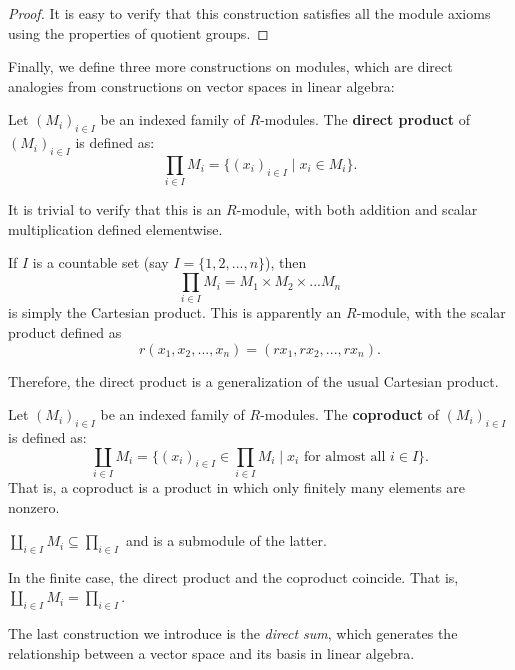 \documentclass[12pt, a4paper, titlepage]{report}
\begin{document}
\begin{proof}
  It is easy to verify that this construction satisfies all the module axioms using the properties of quotient groups.
\end{proof}

Finally, we define three more constructions on modules, which are direct analogies from constructions on vector spaces in linear algebra:

\begin{defn}
  Let $(M_i)_{i \in I}$ be an indexed family of $R$-modules. The \textbf{direct product} of $(M_i)_{i \in I}$ is defined as:
  \[
    \prod_{i \in I} M_i = \{ (x_i)_{i \in I} \mid x_i \in M_i \}.
  \]
\end{defn}

It is trivial to verify that this is an $R$-module, with both addition and scalar multiplication defined elementwise.

\begin{exmp}
  If $I$ is a countable set (say $I = \{ 1, 2, ..., n \}$), then
  \[
    \prod_{i \in I} M_i = M_1 \times M_2 \times ... M_n
  \]
  is simply the Cartesian product. This is apparently an $R$-module, with the scalar product defined as
  \[
    r(x_1, x_2, ..., x_n) = (rx_1, rx_2, ..., rx_n).
  \]

  Therefore, the direct product is a generalization of the usual Cartesian product.
\end{exmp}

\begin{defn}
  Let $(M_i)_{i \in I}$ be an indexed family of $R$-modules. The \textbf{coproduct} of $(M_i)_{i \in I}$ is defined as:
  \[
    \coprod_{i \in I} M_i = \{ (x_i)_{i \in I} \in \prod_{i \in I} M_i \mid x_i \text{ for almost all } i \in I \}.
  \]
  That is, a coproduct is a product in which only finitely many elements are nonzero.
\end{defn}

\begin{rem}
  $\coprod_{i \in I} M_i \subseteq \prod_{i \in I}$ and is a submodule of the latter.
\end{rem}

\begin{rem}
  In the finite case, the direct product and the coproduct coincide. That is,
  $\coprod_{i \in I} M_i = \prod_{i \in I}$.
\end{rem}

The last construction we introduce is the \textit{direct sum}, which generates the relationship between
a vector space and its basis in linear algebra.
\end{document}
